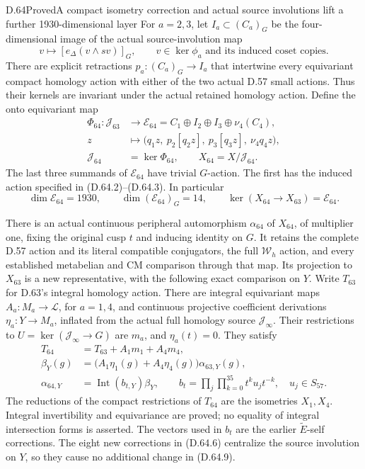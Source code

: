 \begin{statement}{D.64}{Proved}{A compact isometry correction and actual source involutions lift a further 1930-dimensional layer}
For \(a=2,3\), let \(I_a\subset(C_a)_G\) be the
four-dimensional image of the actual source-involution map
\[
       v\longmapsto[e_\Delta(v\wedge sv)]_G,
       \qquad v\in\ker\phi_a
       \text{ and its induced coset copies}.
 \tag{D.64.6}
\]
There are explicit retractions
\(p_a:(C_a)_G\to I_a\) that intertwine every equivariant
compact homology action with either of the two actual
D.57 small actions. Thus their kernels are invariant
under the actual retained homology action.
Define the onto equivariant map
\[
 \begin{aligned}
 \Phi_{64}:\mathcal J_{63}&\longrightarrow
       \mathcal E_{64}=C_1\oplus I_2\oplus I_3\oplus\nu_4(C_4),\\
 z&\longmapsto
    \bigl(q_1z,\ p_2[q_2z],\ p_3[q_3z],\ \nu_4q_4z\bigr),\\
 \mathcal J_{64}&=\ker\Phi_{64},\qquad X_{64}=X/\mathcal J_{64}.
 \end{aligned}
 \tag{D.64.7}
\]
The last three summands of \(\mathcal E_{64}\) have trivial
\(G\)-action. The first has the induced action specified
in (D.64.2)--(D.64.3). In particular
\[
 \dim\mathcal E_{64}=1930,\qquad
 \dim(\mathcal E_{64})_G=14,
 \qquad
 \ker(X_{64}\longrightarrow X_{63})=\mathcal E_{64}.
 \tag{D.64.8}
\]

There is an actual continuous peripheral automorphism
\(\alpha_{64}\) of \(X_{64}\), of multiplier one,
fixing the original cusp \(t\) and inducing identity
on \(G\). It retains the complete D.57 action and its
literal compatible conjugators, the full \(\mathcal W_h\)
action, and every established metabelian and CM comparison
through that map. Its projection to \(X_{63}\) is a
new representative, with the following exact comparison
on \(Y\). Write \(T_{63}\) for D.63's integral homology
action. There are integral equivariant maps
\(A_a:M_a\to\mathcal L\), for \(a=1,4\), and continuous
projective coefficient derivations \(\eta_a:Y\to M_a\),
inflated from the actual full homology source
\(\mathcal J_\infty\). Their restrictions to
\(U=\ker(\mathcal J_\infty\to G)\) are \(m_a\),
and \(\eta_a(t)=0\). They satisfy
\[
 \begin{aligned}
 T_{64}&=T_{63}+A_1m_1+A_4m_4,\\
 \beta_Y(g)&=\bigl(A_1\eta_1(g)+A_4\eta_4(g)\bigr)
                                        \alpha_{63,Y}(g),\\
 \alpha_{64,Y}&=\operatorname{Int}(b_{t,Y})\beta_Y,
 \qquad
 b_t=\prod_j\prod_{k=0}^{35}t^ku_jt^{-k},\quad u_j\in S_{57}.
 \end{aligned}
 \tag{D.64.9}
\]
The reductions of the compact restrictions of \(T_{64}\)
are the isometries \(X_1,X_4\). Integral invertibility
and equivariance are proved; no equality of integral
intersection forms is asserted. The vectors used in
\(b_t\) are the earlier \(\widetilde E\)-self corrections.
The eight new corrections in (D.64.6) centralize the
source involution on \(Y\), so they cause no additional
change in (D.64.9).


\end{statement}
